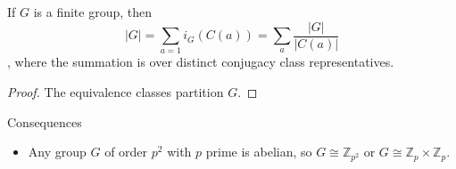 \begin{theorem}
	If $G$ is a finite group, then
	\[
		|G| = \sum_{a=1} i_G\left( C(a) \right)  = \sum_a \frac{|G|}{|C(a)|}
	\]
	, where the summation is over distinct conjugacy class representatives. 
\end{theorem}
\begin{proof}
	The equivalence classes partition $G$.
\end{proof}

Consequences
\begin{itemize}
	\item Any group $G$ of order $p^2$ with $p$ prime is abelian, so $G \cong \mathbb{Z}_{p^2}$ or $G \cong \mathbb{Z}_p \times \mathbb{Z}_p$.
\end{itemize}
